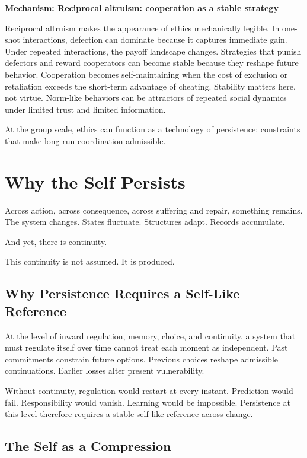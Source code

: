 \documentclass[11pt,twoside,openright]{book}
\newenvironment{mechanismbox}[1]
  {\begin{framed}\noindent\textbf{Mechanism: #1}\par\medskip}
  {\end{framed}}
\begin{document}
\begin{mechanismbox}{Reciprocal altruism: cooperation as a stable strategy}

Reciprocal altruism makes the appearance of ethics mechanically legible. In one-shot interactions, defection can dominate because it captures immediate gain. Under repeated interactions, the payoff landscape changes. Strategies that punish defectors and reward cooperators can become stable because they reshape future behavior. Cooperation becomes self-maintaining when the cost of exclusion or retaliation exceeds the short-term advantage of cheating. Stability matters here, not virtue. Norm-like behaviors can be attractors of repeated social dynamics under limited trust and limited information.

At the group scale, ethics can function as a technology of persistence: constraints that make long-run coordination admissible.

\end{mechanismbox}
\chapter{Why the Self Persists}
\label{ch:self_persists}

Across action, across consequence, across suffering and repair, something remains. The system changes. States fluctuate. Structures adapt. Records accumulate.

And yet, there is continuity.

This continuity is not assumed. It is produced.

\section*{Why Persistence Requires a Self-Like Reference}

At the level of inward regulation, memory, choice, and continuity, a system that must regulate itself over time cannot treat each moment as independent. Past commitments constrain future options. Previous choices reshape admissible continuations. Earlier losses alter present vulnerability.

Without continuity, regulation would restart at every instant. Prediction would fail. Responsibility would vanish. Learning would be impossible. Persistence at this level therefore requires a stable self-like reference across change.

\section*{The Self as a Compression}
\end{document}

